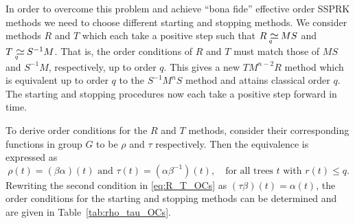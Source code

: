 In order to overcome this problem and achieve ``bona fide'' effective order 
SSPRK methods we need to choose different starting and stopping methods. 
We consider methods $R$ and $T$ which each take a positive step such that 
$R \equival{q} MS$ and $T \equival{q} S^{-1}M$.
That is, the order conditions of $R$ and $T$ must match those of
$MS$ and $S^{-1}M$, respectively, up to order $q$.
This gives a new $TM^{n-2}R$ method which is equivalent up to order $q$ 
to the $S^{-1}M^nS$ method and attains classical order $q$.
The starting and stopping procedures now each take a positive step forward 
in time.

To derive order conditions for the $R$ and $T$ methods, consider their
corresponding functions in group $G$ to be $\rho$ and $\tau$
respectively.
Then the equivalence is expressed as
\begin{equation} \label{eq:R_T_OCs}
    \rho(t) = (\beta\alpha)(t) \text{ and } \tau(t) = (\alpha\beta^{-1})(t), \quad \text{for all 
    trees $t$ with $r(t) \leq q$.}
\end{equation}
Rewriting the second condition in \eqref{eq:R_T_OCs} as 
$(\tau\beta)(t) = \alpha(t)$, the order conditions for the starting and stopping 
methods can be determined and are given in Table~\ref{tab:rho_tau_OCs}.

